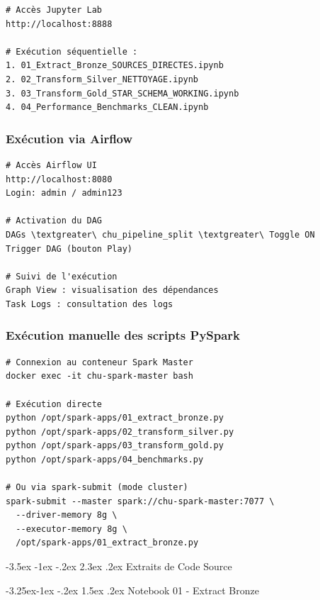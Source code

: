 \documentclass[12pt,a4paper]{article}
\makeatletter
\renewcommand\section{\@startsection{section}{1}{\z@}%
    {-3.5ex \@plus -1ex \@minus -.2ex}%
    {2.3ex \@plus.2ex}%
    {\normalfont\Large\bfseries\color{blue!70!black}}}
\renewcommand\subsection{\@startsection{subsection}{2}{\z@}%
    {-3.25ex\@plus -1ex \@minus -.2ex}%
    {1.5ex \@plus .2ex}%
    {\normalfont\large\bfseries\color{blue!50!black}}}
\makeatother
\begin{document}
\begin{verbatim}
# Accès Jupyter Lab
http://localhost:8888

# Exécution séquentielle :
1. 01_Extract_Bronze_SOURCES_DIRECTES.ipynb
2. 02_Transform_Silver_NETTOYAGE.ipynb
3. 03_Transform_Gold_STAR_SCHEMA_WORKING.ipynb
4. 04_Performance_Benchmarks_CLEAN.ipynb
\end{verbatim}

\subsubsection{Exécution via Airflow}

\begin{verbatim}
# Accès Airflow UI
http://localhost:8080
Login: admin / admin123

# Activation du DAG
DAGs \textgreater\ chu_pipeline_split \textgreater\ Toggle ON
Trigger DAG (bouton Play)

# Suivi de l'exécution
Graph View : visualisation des dépendances
Task Logs : consultation des logs
\end{verbatim}

\subsubsection{Exécution manuelle des scripts PySpark}

\begin{verbatim}
# Connexion au conteneur Spark Master
docker exec -it chu-spark-master bash

# Exécution directe
python /opt/spark-apps/01_extract_bronze.py
python /opt/spark-apps/02_transform_silver.py
python /opt/spark-apps/03_transform_gold.py
python /opt/spark-apps/04_benchmarks.py

# Ou via spark-submit (mode cluster)
spark-submit --master spark://chu-spark-master:7077 \
  --driver-memory 8g \
  --executor-memory 8g \
  /opt/spark-apps/01_extract_bronze.py
\end{verbatim}

\newpage
\section{Extraits de Code Source}

\subsection{Notebook 01 - Extract Bronze}
\end{document}

